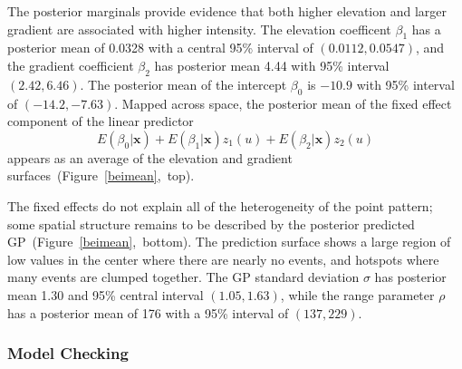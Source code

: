 \documentclass{interact}
\begin{document}
The posterior marginals provide evidence that both higher elevation and larger
gradient are associated with higher intensity. The elevation coefficent
\(\beta_{1}\) has a posterior mean of 0.0328 with a central 95\% interval of
\((0.0112, 0.0547)\), and the gradient coefficient \(\beta_{2}\) has posterior
mean 4.44 with 95\% interval \((2.42, 6.46)\). The posterior mean of the
intercept \(\beta_{0}\) is \(-10.9\) with 95\% interval of \((-14.2, -7.63)\).
Mapped across space, the posterior mean of the fixed effect component of the
linear predictor
\begin{equation}
E(\beta_{0} | \mathbf{x}) + E(\beta_{1} | \mathbf{x}) z_{1}(u)
+ E(\beta_{2} | \mathbf{x}) z_{2}(u)
\end{equation}
appears as an average of the elevation and gradient
surfaces~(Figure~\ref{beimean},~top).

The fixed effects do not explain all of the heterogeneity of the point pattern;
some spatial structure remains to be described by the posterior predicted
GP~(Figure~\ref{beimean},~bottom). The prediction surface shows a large region
of low values in the center where there are nearly no events, and hotspots
where many events are clumped together. The GP standard deviation \(\sigma\)
has posterior mean 1.30 and 95\% central interval \((1.05, 1.63)\), while the
range parameter \(\rho\) has a posterior mean of 176 with a 95\% interval of
\((137, 229)\).


\subsubsection{Model Checking}
\label{beiresid}
\end{document}
